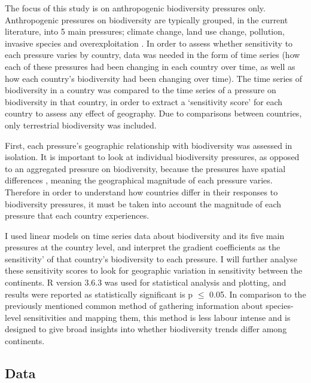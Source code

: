\documentclass[11pt, a4paper, titlepage]{article}
\begin{document}
	The focus of this study is on anthropogenic biodiversity pressures only. Anthropogenic pressures on biodiversity are typically grouped, in the current literature, into 5 main pressures; climate change, land use change, pollution, invasive species and overexploitation \citep{watson2019summary}. In order to assess whether sensitivity to each pressure varies by country, data was needed in the form of time series (how each of these pressures had been changing in each country over time, as well as how each country's biodiversity had been changing over time). The time series of biodiversity in a country was compared to the time series of a pressure on biodiversity in that country, in order to extract a `sensitivity score' for each country to assess any effect of geography. Due to comparisons between countries, only terrestrial biodiversity was included. \newline
	
	First, each pressure's geographic relationship with biodiversity was assessed in isolation. It is important to look at individual biodiversity pressures, as opposed to an aggregated pressure on biodiversity, because the pressures have spatial differences \citep{steffen2015planetary}, meaning the geographical magnitude of each pressure varies. Therefore in order to understand how countries differ in their responses to biodiversity pressures, it must be taken into account the magnitude of each pressure that each country experiences. \newline
	
	I used linear models on time series data about biodiversity and its five main pressures at the country level, and interpret the gradient coefficients as the sensitivity' of that country's biodiversity to each pressure. I will further analyse these sensitivity scores to look for geographic variation in sensitivity between the continents. R version 3.6.3 was used for statistical analysis and plotting, and results were reported as statistically significant is p $\leq$ 0.05. In comparison to the previously mentioned common method of gathering information about species-level sensitivities and mapping them, this method is less labour intense and is designed to give broad insights into whether biodiversity trends differ among continents. \newline
	\subsection*{Data}
	
\end{document}
